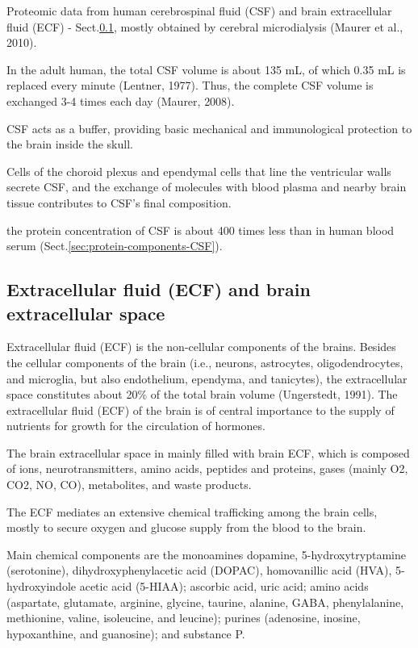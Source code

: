 Proteomic data from human cerebrospinal fluid (CSF) and brain extracellular
fluid (ECF) - Sect.\ref{sec:ECF}, mostly obtained by cerebral microdialysis
(Maurer et al., 2010).

In the adult human, the total CSF volume is about 135 mL, of which 0.35 mL is
replaced every minute (Lentner, 1977).
Thus, the complete CSF volume is exchanged 3-4 times each day (Maurer, 2008).

CSF acts as a buffer, providing basic mechanical and immunological protection to
the brain inside the skull.

Cells of the choroid plexus and ependymal cells that line the ventricular walls
secrete CSF, and the exchange of molecules with blood plasma and nearby brain
tissue contributes to CSF's final composition.

the protein concentration of CSF is about 400 times less than in human blood
serum (Sect.\ref{sec:protein-components-CSF}).

\subsection{Extracellular fluid (ECF) and brain extracellular space}
\label{sec:ECF}

Extracellular fluid (ECF) is the non-cellular components of the brains.
Besides the cellular components of the brain (i.e., neurons, astrocytes,
oligodendrocytes, and microglia, but also endothelium, ependyma, and tanicytes),
the extracellular space constitutes about 20\% of the total brain volume
(Ungerstedt, 1991). The extracellular fluid (ECF) of the brain is of central
importance to the supply of nutrients for growth for the circulation of
hormones.

The brain extracellular space in mainly filled with brain ECF, which is composed
of ions, neurotransmitters, amino acids, peptides and proteins, gases (mainly
O2, CO2, NO, CO), metabolites, and waste products.

The ECF mediates an extensive chemical trafficking among the brain cells, mostly
to secure oxygen and glucose supply from the blood to the brain.

Main chemical components are the monoamines dopamine, 5-hydroxytryptamine
(serotonine), dihydroxyphenylacetic acid (DOPAC), homovanillic acid (HVA),
5-hydroxyindole acetic acid (5-HIAA); ascorbic acid, uric acid; amino acids
(aspartate, glutamate, arginine, glycine, taurine, alanine, GABA, phenylalanine,
methionine, valine, isoleucine, and leucine); purines (adenosine, inosine,
hypoxanthine, and guanosine); and substance P.

